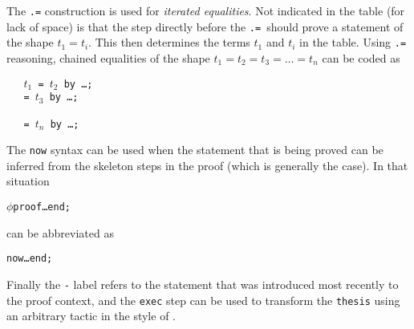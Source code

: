 \documentclass{LMCS}
\let\xmedskip=\medskip
\begin{document}
The \texttt{.=} construction is used for \emph{iterated equalities}.
Not indicated in the table (for lack of space) is that the step directly before the
\texttt{.=}\,
should prove a statement of the shape $t_1 = t_i$.
This then determines the terms $t_1$ and $t_i$ in the table.
Using \texttt{.=} reasoning, chained equalities of the shape
$t_1 = t_2 = t_3 = \dots = t_n$
can be coded as
\xmedskip
\begin{flushleft}\tt
\ \ $t_1$ = $t_2$ by {\rm\dots}; \\
\ \ \phantom{$t_1$} = $t_3$ by {\rm\dots}; \\
\ \ \phantom{$t_1$} \llap{\rlap{\rm\dots}\phantom{\tt .}} \\
\ \ \phantom{$t_1$} = $t_n$ by {\rm\dots};
\end{flushleft}
\xmedskip
\noindent
{}
The \texttt{now} syntax can be used when the statement that is
being proved can be inferred from the skeleton steps
in the proof (which is generally the case).
In that situation
\xmedskip
\begingroup
\def\form{$\phi$}
\def\xdots{\dots}
\begin{alltt}
  \form proof \xdots end;
\end{alltt}
\xmedskip
\noindent
can be abbreviated as
\xmedskip
\begin{alltt}
  now \xdots end;
\end{alltt}
\endgroup
\xmedskip
\noindent
Finally the \texttt{-} label refers to the statement that was introduced most recently to the proof context,
and the \texttt{exec} step can be used to transform the \texttt{thesis} using an arbitrary tactic in the style of \cite{wie:01}.
\end{document}
